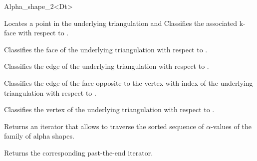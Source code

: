 \begin{ccRefClass} {Alpha_shape_2<Dt>}
%



{Locates a point   in the underlying triangulation and Classifies the 
associated k-face with respect to \ccVar.}

{Classifies the face  of the underlying triangulation with respect to \ccVar.}

{Classifies the edge  of the underlying triangulation with respect to \ccVar.}

{Classifies the edge of the face  opposite to the vertex with index
of the underlying triangulation with respect to \ccVar.}	

{Classifies the vertex  of the underlying triangulation with respect to \ccVar.}



{Returns an iterator that allows to traverse the
sorted sequence of $\alpha$-values of the family of alpha shapes.}

{Returns the corresponding past-the-end iterator.}


\end{ccRefClass}
